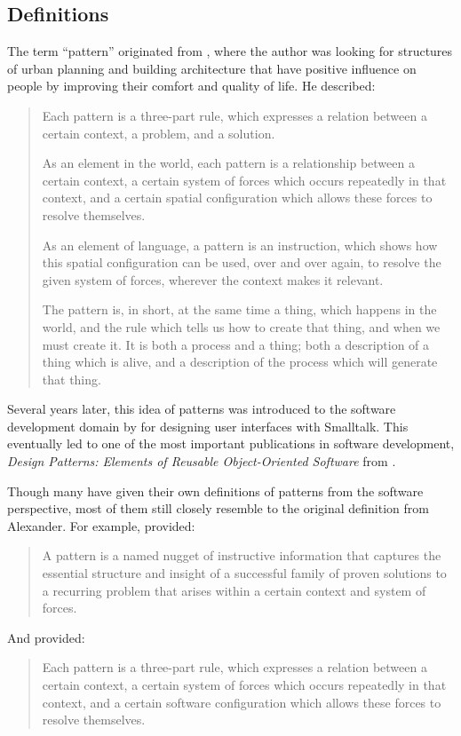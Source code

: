 \documentclass{acm_proc_article-sp}
\begin{document}
\subsection{Definitions}
The term ``pattern'' originated from \citet{timeless:alexander}, where
the author was looking for structures of urban planning and building
architecture that have positive influence on people by improving their
comfort and quality of life. He described:
\begin{quote}
Each pattern is a three-part rule, which expresses a relation between
a certain context, a problem, and a solution.

As an element in the world, each pattern is a relationship between a
certain context, a certain system of forces which occurs repeatedly in
that context, and a certain spatial configuration which allows these
forces to resolve themselves.

As an element of language, a pattern is an instruction, which shows
how this spatial configuration can be used, over and over again, to
resolve the given system of forces, wherever the context makes it
relevant.

The pattern is, in short, at the same time a thing, which happens in
the world, and the rule which tells us how to create that thing, and
when we must create it. It is both a process and a thing; both a
description of a thing which is alive, and a description of the
process which will generate that thing.
\end{quote}

Several years later, this idea of patterns was introduced to the
software development domain by \citet{patterns:beck} for designing
user interfaces with Smalltalk. This eventually led to one of the most
important publications in software development, \textit{Design
  Patterns: Elements of Reusable Object-Oriented Software} from
\citet{patterns:gamma}.

Though many have given their own definitions of patterns from the
software perspective, most of them still closely resemble to the
original definition from Alexander. For example,
\citet{patterns:appleton} provided:
\begin{quote}
A pattern is a named nugget of instructive information that captures
the essential structure and insight of a successful family of proven
solutions to a recurring problem that arises within a certain context
and system of forces.
\end{quote}
And \citet{timeless:gabriel} provided:
\begin{quote}
Each pattern is a three-part rule, which expresses a relation between
a certain context, a certain system of forces which occurs repeatedly
in that context, and a certain software configuration which allows
these forces to resolve themselves.
\end{quote}
\end{document}
